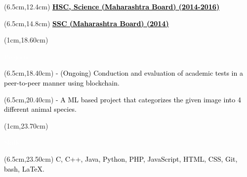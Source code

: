 \documentclass[10pt,a4paper,twocolumn]{article}
\begin{document}
\begin{textblock*}{14cm}(6.5cm,12.4cm)
   \textcolor{black}{\fontsize{15}{20}\selectfont \underline{\textbf{HSC, Science (Maharashtra Board)\hspace{25mm} (2014-2016)}}\vspace{2mm} }
\end{textblock*}
\begin{textblock*}{14cm}(6.5cm,14.8cm)
   \textcolor{black}{\fontsize{15}{20}\selectfont \underline{\textbf{SSC (Maharashtra Board) \hspace{6cm} (2014)}}\vspace{2mm} }
\end{textblock*}
\begin{textblock*}{3.5cm}(1cm,18.60cm)
   \begin{mdframed}[style=Frame1]
   \textcolor{white}{\fontsize{20}{20}\selectfont Projects}
   \end{mdframed}
\end{textblock*}
\begin{textblock*}{14cm}(6.5cm,18.40cm)
   \textcolor{black}{\fontsize{15}{20}\selectfont  {1] Secured e-Assessment using blockchain: } \vspace{3mm}
   \newline- (Ongoing) Conduction and evaluation of academic tests in a peer-to-peer manner using blockchain.}
\end{textblock*}
\begin{textblock*}{14cm}(6.5cm,20.40cm)
   \textcolor{black}{\fontsize{15}{20}\selectfont  {2] Image Classifier using tensorflow: } \vspace{3mm}
   \newline- A ML based project that categorizes the given image into 4 different animal species.}
\end{textblock*}
\begin{textblock*}{2.5cm}(1cm,23.70cm)
   \begin{mdframed}[style=Frame1]
   \textcolor{white}{\fontsize{20}{20}\selectfont Skills}
   \end{mdframed}
\end{textblock*}
\begin{textblock*}{14cm}(6.5cm,23.50cm)
   \textcolor{black}{\fontsize{15}{20}\selectfont  {1] Good grasp of following \vspace{1mm}programming languages and technologies:}\vspace{1mm} C, C++, Java, Python, PHP, JavaScript, HTML, CSS, Git, bash, LaTeX.}
\end{textblock*}
\end{document}
